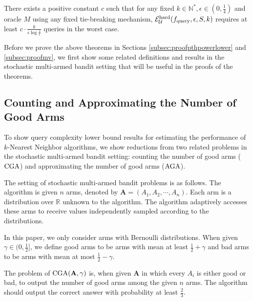 \begin{theorem}
\label{thm:mv}
There exists a positive constant $c$ such that for any fixed $k\in\mathbb{N}^*,\epsilon\in(0,\frac{1}{4})$ and oracle $M$ using any fixed tie-breaking mechanism, $\mathcal{E}^{\mathrm{hard}}_{{\mathcal{U}}}(f_{\mathrm{query}},\epsilon,S,k)$ requires at least $c\cdot\frac{k}{\epsilon\log\frac{1}{\epsilon}}$ queries in the worst case.
\end{theorem}

Before we prove the above theorems in Sections \ref{subsec:proofpthpowerlower} and \ref{subsec:proofmv}, we first show some related definitions and results in the stochastic multi-armed bandit setting that will be useful in the proofs of the theorems.

\subsection{Counting and Approximating the Number of Good Arms}
\label{subsec:arm}
To show query complexity lower bound results for estimating the performance of $k$-Nearest Neighbor algorithms, we show reductions from two related problems in the stochastic multi-armed bandit setting: counting the number of good arms (${\mathrm{CGA}}$) and approximating the number of good arms (${\mathrm{AGA}}$).

The setting of stochastic multi-armed bandit problems \citep{R85} is as follows. The algorithm is given $n$ arms, denoted by $\mathbf A=(A_1,A_2,\cdots,A_n)$. Each arm is a distribution over $\mathbb R$ unknown to the algorithm. The algorithm adaptively accesses these arms to receive values independently sampled according to the distributions.

In this paper, we only consider arms with Bernoulli distributions. When given $\gamma\in(0,\frac{1}{2}]$, we define good arms to be arms with mean at least $\frac{1}{2}+\gamma$ and bad arms to be arms with mean at most $\frac{1}{2}-\gamma$.

The problem of ${\mathrm{CGA}}(\mathbf A,\gamma)$ is, when given $\mathbf A$ in which every $A_i$ is either good or bad, to output the number of good arms among the given $n$ arms. The algorithm should output the correct answer with probability at least $\frac{2}{3}$.

